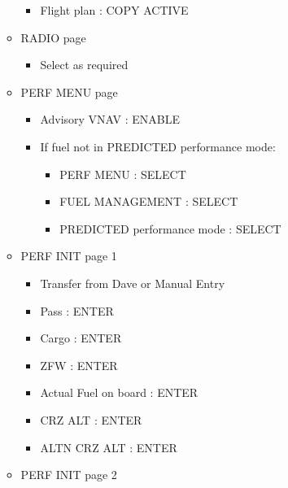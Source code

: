 \begin{itemize}
\begin{itemize}
\begin{itemize}
\item Flight plan : COPY ACTIVE

\end{itemize}

\item RADIO page

\begin{itemize}
\item Select as required

\end{itemize}

\item PERF MENU page

\begin{itemize}
\item Advisory VNAV : ENABLE

\item If fuel not in PREDICTED performance mode:

\begin{itemize}
\item PERF MENU : SELECT

\item FUEL MANAGEMENT : SELECT

\item PREDICTED performance mode : SELECT

\end{itemize}

\end{itemize}

\item PERF INIT page 1

\begin{itemize}
\item Transfer from Dave or Manual Entry

\item Pass : ENTER

\item Cargo : ENTER

\item ZFW : ENTER

\item Actual Fuel on board : ENTER

\item CRZ ALT : ENTER

\item ALTN CRZ ALT : ENTER

\end{itemize}

\item PERF INIT page 2


\end{itemize}
\end{itemize}
